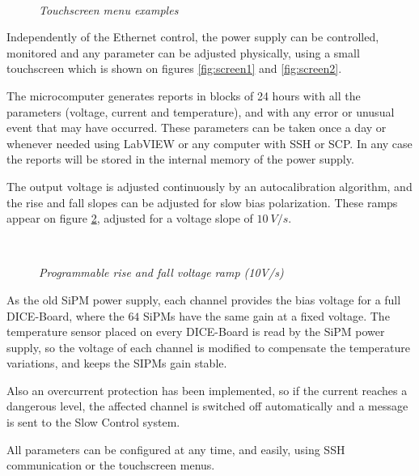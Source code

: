 \begin{figure}[ht]
\centering
{}
\hspace{20mm}
 \\
\caption{\textit{Touchscreen menu examples}}
\label{fig:screen}
\end{figure}

Independently of the Ethernet control, the power supply can be controlled, monitored and any parameter can be adjusted physically, using a small touchscreen which is shown on figures \ref{fig:screen1} and \ref{fig:screen2}.

The microcomputer generates reports in blocks of 24 hours with all the parameters (voltage, current and temperature), and with any error or unusual event that may have occurred. These parameters can be taken once a day or whenever needed using LabVIEW or any computer with SSH or SCP. In any case the reports will be stored in the internal memory of the power supply. 

The output voltage is adjusted continuously by an autocalibration algorithm, and the rise and fall slopes can be adjusted for slow bias polarization. These ramps appear on figure \ref{fig:ramp}, adjusted for a voltage slope of $10\ V/s$.

\begin{figure}[ht]
\centering
{}
 \\
\caption{\textit{Programmable rise and fall voltage ramp (10V/s)}}
\label{fig:ramp}
\end{figure}

As the old SiPM power supply, each channel provides the bias voltage for a full DICE-Board, where the $64$ SiPMs have the same gain at a fixed voltage. The temperature sensor placed on every DICE-Board is read by the SiPM power supply, so the voltage of each channel is modified to compensate the temperature variations, and keeps the SIPMs gain stable.

Also an overcurrent protection has been implemented, so if the current reaches a dangerous level, the affected channel is switched off automatically and a message is sent to the Slow Control system.

All parameters can be configured at any time, and easily, using SSH communication or the touchscreen menus.


